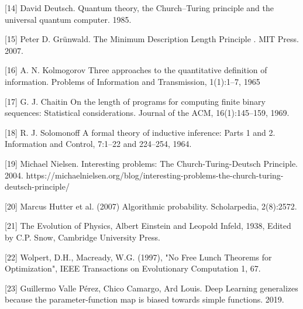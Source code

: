 \documentclass{article}
\begin{document}
[14] David Deutsch. Quantum theory, the Church–Turing principle and the universal quantum computer. 1985.

[15] Peter D. Grünwald. The Minimum Description Length Principle . MIT Press. 2007.

[16] A. N. Kolmogorov Three approaches to the quantitative definition of information. Problems of Information and Transmission, 1(1):1--7, 1965

[17] G. J. Chaitin On the length of programs for computing finite binary sequences: Statistical considerations. Journal of the ACM, 16(1):145--159, 1969.

[18] R. J. Solomonoff A formal theory of inductive inference: Parts 1 and 2. Information and Control, 7:1--22 and 224--254, 1964.

[19] Michael Nielsen. Interesting problems: The Church-Turing-Deutsch Principle. 2004. https://michaelnielsen.org/blog/interesting-problems-the-church-turing-deutsch-principle/

[20] Marcus Hutter et al. (2007) Algorithmic probability. Scholarpedia, 2(8):2572.

[21] The Evolution of Physics, Albert Einstein and Leopold Infeld, 1938, Edited by C.P. Snow, Cambridge University Press.

[22] Wolpert, D.H., Macready, W.G. (1997), "No Free Lunch Theorems for Optimization", IEEE Transactions on Evolutionary Computation 1, 67.

[23] Guillermo Valle Pérez, Chico Camargo, Ard Louis. Deep Learning generalizes because the parameter-function map is biased towards simple functions. 2019.
\end{document}
